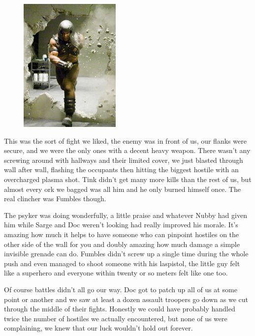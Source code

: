\begin{figure}
	\begin{center}
		\includegraphics[width=\figwidth]{pics/9/52.png}
	\end{center}
\end{figure}
This was the sort of fight we liked, the enemy was in front of us, our flanks were secure, and we were the only ones with a decent heavy weapon. 
There wasn't any screwing around with hallways and their limited cover, we just blasted through wall after wall, flashing the occupants then hitting the biggest hostile with an overcharged plasma shot. 
Tink didn't get many more kills than the rest of us, but almost every ork we bagged was all him and he only burned himself once. 
The real clincher was Fumbles though.

The psyker was doing wonderfully, a little praise and whatever Nubby had given him while Sarge and Doc weren't looking had really improved his morale. 
It's amazing how much it helps to have someone who can pinpoint hostiles on the other side of the wall for you and doubly amazing how much damage a simple invisible grenade can do. 
Fumbles didn't screw up a single time during the whole push and even managed to shoot someone with his laspistol, the little guy felt like a superhero and everyone within twenty or so meters felt like one too.

Of course battles didn't all go our way. 
Doc got to patch up all of us at some point or another and we saw at least a dozen assault troopers go down as we cut through the middle of their fights. 
Honestly we could have probably handled twice the number of hostiles we actually encountered, but none of us were complaining, we knew that our luck wouldn't hold out forever.

